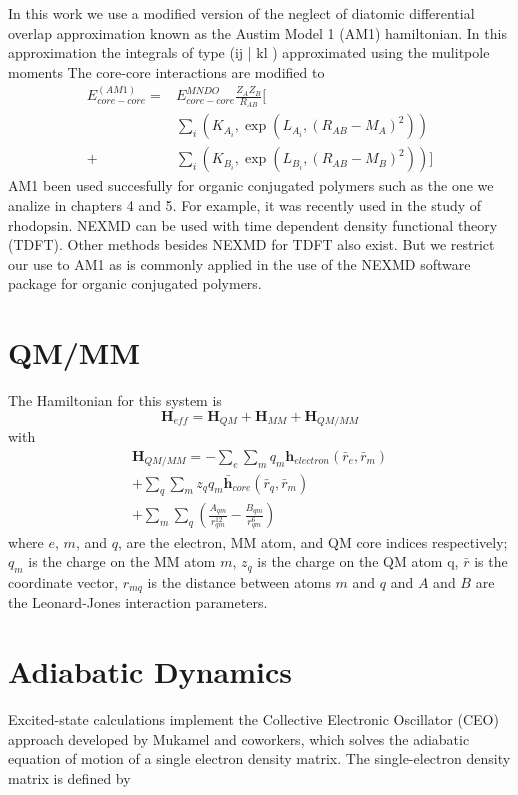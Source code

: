In this work we use a modified version of the neglect of diatomic differential overlap approximation known as the Austim Model 1 (AM1) hamiltonian. \cite{Dewar1985}
In this approximation the integrals of type (ij | kl ) approximated using the mulitpole moments \cite{Dewar1985}
The core-core interactions are modified to
\begin{align}
E_{core-core}^(AM1) = &E_{core-core}^{MNDO} \frac{Z_{A} Z_{B}}{R_{AB}} [\\
  &\sum_i (K_{A_i}, \exp(L_{A_i}, (R_{AB} - M_A)^2)) \\
+ &\sum_i (K_{B_i}, \exp(L_{B_i}, (R_{AB} - M_B)^2))]
\end{align}\cite{christensen2016semiempirical}
AM1 been used succesfully for organic conjugated polymers such as the one we analize in chapters 4 and 5. \cite{ozaki2019molecular,silva2010benchmark,moran2003excited}
For example, it was recently used in the study of rhodopsin. \cite{weingart2012modelling}
NEXMD can be used with time dependent density functional theory (TDFT). \cite{tretiak2003resonant}
Other methods besides NEXMD for TDFT also exist. \cite{ou2015first}
But we restrict our use to AM1 as is commonly applied in the use of the NEXMD software package for organic conjugated polymers.

\section{QM/MM}
    The Hamiltonian for this system is 
    \begin{equation}
     \mathbf{H}_{eff}=\mathbf{H}_{QM}+\mathbf{H}_{MM}+\mathbf{H}_{QM/MM} 
    \end{equation}
    with
    \begin{align}\label{eq:qmmm}
      \mathbf{H}_{QM/MM}=-\sum_{e}\sum_mq_m\mathbf{h}_{electron}(\bar{r}_e,\bar{r}_m)\\
      +\sum_q\sum_mz_qq_m\bar{\mathbf{h}}_{core}(\bar{r}_q,\bar{r}_m)\\
      +\sum_m\sum_q\left( \frac{A_{qm}}{r_{qm}^{12}}-\frac{B_{qm}}{r_{qm}^6} \right)
    \end{align}
    where $e$, $m$, and $q$, are the electron, MM atom, and QM core indices respectively;
    $q_m$ is the charge on the MM atom $m$, $z_q$ is the charge on the QM atom q, $\bar{r}$ is the coordinate vector, $r_{mq}$ is the distance between atoms $m$ and $q$ and $A$ and $B$ are the Leonard-Jones interaction parameters.\cite{Walker2008}

\section{Adiabatic Dynamics}
	Excited-state calculations implement the Collective Electronic Oscillator (CEO) approach developed by Mukamel and coworkers, which solves the adiabatic equation of motion of a single electron density matrix.
	The single-electron density matrix is defined by  

